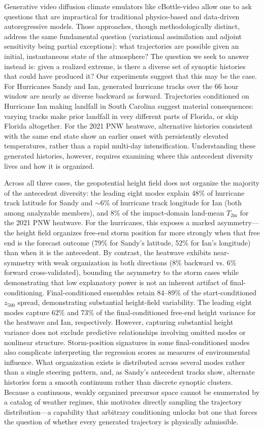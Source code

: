 \documentclass[final]{agujournal2019}
\begin{document}
Generative video diffusion climate emulators like cBottle-video allow one to ask questions that are impractical for traditional physics-based and data-driven autoregressive models. Those approaches, though methodologically distinct, address the same fundamental question (variational assimilation and adjoint sensitivity being partial exceptions): what trajectories are possible given an initial, instantaneous state of the atmosphere? The question we seek to answer instead is: given a realized extreme, is there a diverse set of synoptic histories that could have produced it? Our experiments suggest that this may be the case. For Hurricanes Sandy and Ian, generated hurricane tracks over the 66 hour window are nearly as diverse backward as forward. Trajectories conditioned on Hurricane Ian making landfall in South Carolina suggest material consequences: varying tracks make prior landfall in very different parts of Florida, or skip Florida altogether. For the 2021 PNW heatwave, alternative histories consistent with the same end state show an earlier onset with persistently elevated temperatures, rather than a rapid multi-day intensification. Understanding these generated histories, however, requires examining where this antecedent diversity lives and how it is organized.

Across all three cases, the geopotential height field does not organize the majority of the antecedent diversity: the leading eight modes explain 48\% of hurricane track latitude for Sandy and $\sim$6\% of hurricane track longitude for Ian (both among analyzable members), and 8\% of the impact-domain land-mean $T_{\mathrm{2m}}$ for the 2021 PNW heatwave. For the hurricanes, this exposes a marked asymmetry---the height field organizes free-end storm position far more strongly when that free end is the forecast outcome (79\% for Sandy's latitude, 52\% for Ian's longitude) than when it is the antecedent. By contrast, the heatwave exhibits near-symmetry with weak organization in both directions (8\% backward vs. 6\% forward cross-validated), bounding the asymmetry to the storm cases while demonstrating that low explanatory power is not an inherent artifact of final-conditioning. Final-conditioned ensembles retain 84--89\% of the start-conditioned $z_{500}$ spread, demonstrating substantial height-field variability. The leading eight modes capture 62\% and 73\% of the final-conditioned free-end height variance for the heatwave and Ian, respectively. However, capturing substantial height variance does not exclude predictive relationships involving omitted modes or nonlinear structure. Storm-position signatures in some final-conditioned modes also complicate interpreting the regression scores as measures of environmental influence. What organization exists is distributed across several modes rather than a single steering pattern, and, as Sandy's antecedent tracks show, alternate histories form a smooth continuum rather than discrete synoptic clusters. Because a continuous, weakly organized precursor space cannot be enumerated by a catalog of weather regimes, this motivates directly sampling the trajectory distribution---a capability that arbitrary conditioning unlocks but one that forces the question of whether every generated trajectory is physically admissible.
\end{document}
